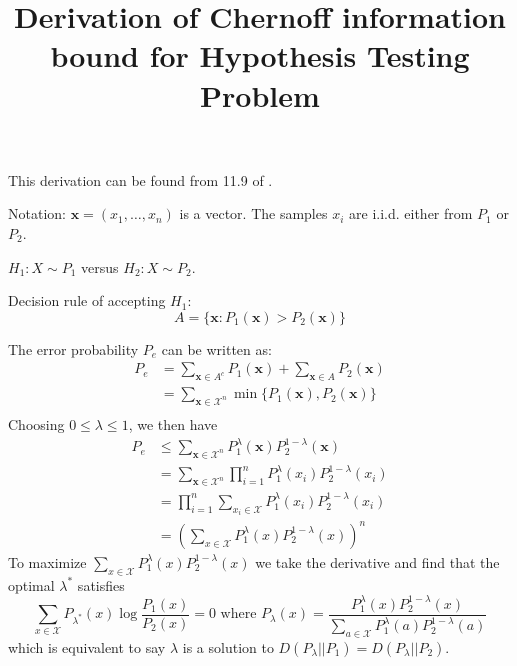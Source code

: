 \documentclass{article}
\title{Derivation of Chernoff information bound for Hypothesis Testing Problem}
\begin{document}
\maketitle
This derivation can be found from 11.9 of \cite{it}.

Notation: $\bm{x} = (x_1, \dots, x_n)$ is a vector. The samples $x_i$ are i.i.d. either from $P_1$ or $P_2$.

$ H_1: X \sim P_1 $ versus $ H_2:  X \sim P_2 $.

Decision rule of accepting $H_1$:
\begin{equation}
A=\{\bm{x}: P_1(\bm{x}) > P_2(\bm{x})\}
\end{equation}

The error probability $P_e$ can be written as:
\begin{align*}
P_e & = \sum_{\bm{x} \in A^c} P_1(\bm{x})
+ \sum_{\bm{x} \in A} P_2(\bm{x}) \\
& = \sum_{\bm{x} \in \mathcal{X}^n} \min \{ P_1(\bm{x}), P_2(\bm{x})\} \\
\end{align*}
Choosing $ 0 \leq \lambda \leq 1 $,
we then have
\begin{align*}
P_e & \leq \sum_{\bm{x} \in \mathcal{X}^n}  P_1^{\lambda}(\bm{x})  P_2^{1-\lambda}(\bm{x}) \\
& =  \sum_{\bm{x} \in \mathcal{X}^n}  \prod_{i=1}^n P_1^{\lambda}(x_i)  P_2^{1-\lambda}(x_i) \\
& = \prod_{i=1}^n \sum_{x_i\in \mathcal{X}} P_1^{\lambda}(x_i)  P_2^{1-\lambda}(x_i) \\
& = \left(\sum_{x\in \mathcal{X}} P_1^{\lambda}(x)  P_2^{1-\lambda}(x)\right)^n
\end{align*}
To maximize $\sum_{x\in \mathcal{X}} P_1^{\lambda}(x)  P_2^{1-\lambda}(x)$ we take the derivative
and find that the optimal $\lambda^*$ satisfies
\begin{equation}
\sum_{x\in \mathcal{X}} P_{\lambda^*}(x) \log \frac{P_1(x)}{P_2(x)} = 0 \textrm{ where }
P_{\lambda}(x) = \frac{P_1^{\lambda}(x)P_2^{1-\lambda}(x)}{\sum_{a\in \mathcal{X}}P_1^{\lambda}(a)P_2^{1-\lambda}(a)}
\end{equation}
which is equivalent to say $\lambda$ is a solution to $D(P_{\lambda}|| P_1) = D(P_{\lambda} || P_2)$.
\end{document}
